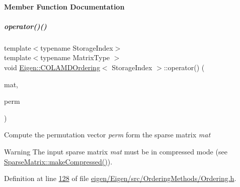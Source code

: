 \paragraph{Member Function Documentation}
\mbox{\label{group___ordering_methods___module_a708cb20191dcd79856d922f262405946}} 
\subparagraph{\texorpdfstring{operator()()}{operator()()}\hspace{0.1cm}{\footnotesize\ttfamily [1/2]}}
{\footnotesize\ttfamily template$<$typename Storage\+Index$>$ \\
template$<$typename Matrix\+Type $>$ \\
void \hyperlink{group___ordering_methods___module_class_eigen_1_1_c_o_l_a_m_d_ordering}{Eigen\+::\+C\+O\+L\+A\+M\+D\+Ordering}$<$ Storage\+Index $>$\+::operator() (\begin{DoxyParamCaption}\item[{const Matrix\+Type \&}]{mat,  }\item[{\hyperlink{group___core___module}{Permutation\+Type} \&}]{perm }\end{DoxyParamCaption})\hspace{0.3cm}{\ttfamily [inline]}}

Compute the permutation vector {\itshape perm} form the sparse matrix {\itshape mat} \begin{DoxyWarning}{Warning}
The input sparse matrix {\itshape mat} must be in compressed mode (see \hyperlink{group___sparse_core___module_a5ff54ffc10296f9466dc81fa888733fd}{Sparse\+Matrix\+::make\+Compressed()}). 
\end{DoxyWarning}


Definition at line \hyperlink{eigen_2_eigen_2src_2_ordering_methods_2_ordering_8h_source_l00128}{128} of file \hyperlink{eigen_2_eigen_2src_2_ordering_methods_2_ordering_8h_source}{eigen/\+Eigen/src/\+Ordering\+Methods/\+Ordering.\+h}.

